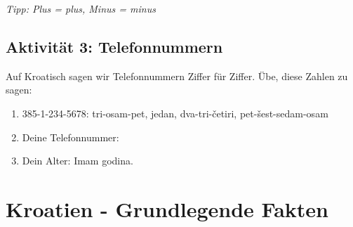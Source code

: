 \begin{exercise}
\textit{Tipp: Plus = plus, Minus = minus}

\subsection*{Aktivität 3: Telefonnummern}

Auf Kroatisch sagen wir Telefonnummern Ziffer für Ziffer. Übe, diese Zahlen zu sagen:

\begin{enumerate}
    \item 385-1-234-5678: tri-osam-pet, jedan, dva-tri-četiri, pet-šest-sedam-osam
    \item Deine Telefonnummer: \underline{\hspace{8cm}}
    \item Dein Alter: Imam \underline{\hspace{3cm}} godina.
\end{enumerate}
\end{exercise}

\section{Kroatien - Grundlegende Fakten}

